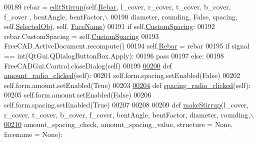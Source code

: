\begin{DoxyCode}
00189                 rebar = \hyperlink{namespaceStirrup_a1f6d278ace7fe116895dba342e2a3573}{editStirrup}(self.\hyperlink{classStirrup_1_1__StirrupTaskPanel_a004a341f992f38ca54893edf92f85faa}{Rebar}, l\_cover, r\_cover, t\_cover, b\_cover, f\_cover
      , bentAngle, bentFactor,\(\backslash\)
00190                     diameter, rounding, \textcolor{keyword}{False}, spacing, self.\hyperlink{classStirrup_1_1__StirrupTaskPanel_a25d8b984bd2817ec46c1375b6bec647d}{SelectedObj}, self.
      \hyperlink{classStirrup_1_1__StirrupTaskPanel_a8c01c4e8108c6aaad15394072b188730}{FaceName})
00191         \textcolor{keywordflow}{if} self.\hyperlink{classStirrup_1_1__StirrupTaskPanel_a88a444f6e236ba21c053f1a6540dd640}{CustomSpacing}:
00192             rebar.CustomSpacing = self.\hyperlink{classStirrup_1_1__StirrupTaskPanel_a88a444f6e236ba21c053f1a6540dd640}{CustomSpacing}
00193             FreeCAD.ActiveDocument.recompute()
00194         self.\hyperlink{classStirrup_1_1__StirrupTaskPanel_a004a341f992f38ca54893edf92f85faa}{Rebar} = rebar
00195         \textcolor{keywordflow}{if} signal == int(QtGui.QDialogButtonBox.Apply):
00196             \textcolor{keywordflow}{pass}
00197         \textcolor{keywordflow}{else}:
00198             FreeCADGui.Control.closeDialog(self)
00199 
\hypertarget{Stirrup_8py_source.tex_l00200}{}\hyperlink{classStirrup_1_1__StirrupTaskPanel_acf38bd6966c793e88ebc0d5d01db3148}{00200}     \textcolor{keyword}{def }\hyperlink{classStirrup_1_1__StirrupTaskPanel_acf38bd6966c793e88ebc0d5d01db3148}{amount\_radio\_clicked}(self):
00201         self.form.spacing.setEnabled(\textcolor{keyword}{False})
00202         self.form.amount.setEnabled(\textcolor{keyword}{True})
00203 
\hypertarget{Stirrup_8py_source.tex_l00204}{}\hyperlink{classStirrup_1_1__StirrupTaskPanel_ac091360b77eb8b65a0f520af0d2c4584}{00204}     \textcolor{keyword}{def }\hyperlink{classStirrup_1_1__StirrupTaskPanel_ac091360b77eb8b65a0f520af0d2c4584}{spacing\_radio\_clicked}(self):
00205         self.form.amount.setEnabled(\textcolor{keyword}{False})
00206         self.form.spacing.setEnabled(\textcolor{keyword}{True})
00207 
00208 
00209 \textcolor{keyword}{def }\hyperlink{namespaceStirrup_a705fc121e2af9c8ac05eb299f4fb9f2f}{makeStirrup}(l\_cover, r\_cover, t\_cover, b\_cover, f\_cover, bentAngle, bentFactor, diameter, 
      rounding,\(\backslash\)
\hypertarget{Stirrup_8py_source.tex_l00210}{}\hyperlink{namespaceStirrup_a705fc121e2af9c8ac05eb299f4fb9f2f}{00210}         amount\_spacing\_check, amount\_spacing\_value, structure = \textcolor{keywordtype}{None}, facename = \textcolor{keywordtype}{None}):

\end{DoxyCode}
